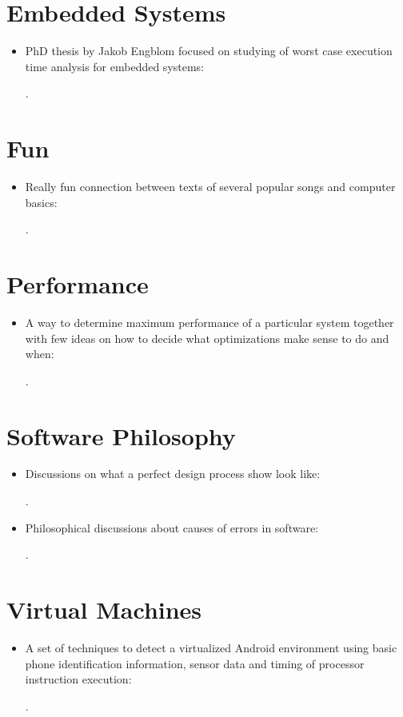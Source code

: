 \documentclass[12pt, a4paper, oneside]{article}
\begin{document}
\section*{Embedded Systems}
\begin{itemize}
    \item PhD thesis by Jakob Engblom focused on studying of worst case execution time analysis for embedded systems:

    \cite{Engblom:WCET:2002}.
\end{itemize}

\section*{Fun}
\begin{itemize}
    \item Really fun connection between texts of several popular songs and computer basics:

    \cite{Colwell:Rock-N-Roll:2002}.
\end{itemize}

\section*{Performance}
\begin{itemize}
    \item A way to determine maximum performance of a particular system together with few ideas on how to decide what optimizations make sense to do and when:

    \cite{Williams:Roofline:2009}.
\end{itemize}

\section*{Software Philosophy}
\begin{itemize}
    \item Discussions on what a perfect design process show look like:

    \cite{Parnas:Fake-It:1986}.

    \item Philosophical discussions about causes of errors in software:

    \cite{Horner:Error-Rates:2019}.
\end{itemize}

\section*{Virtual Machines}
\begin{itemize}
    \item A set of techniques to detect a virtualized Android environment using basic phone identification information, sensor data and timing of processor instruction execution:

    \cite{Petsas:Android-VM-Detection:2014}.
\end{itemize}
\end{document}
